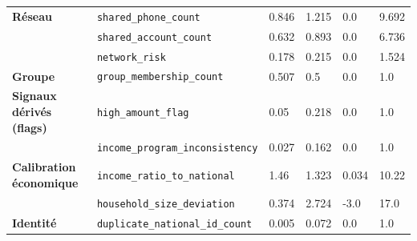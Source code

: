 \begin{table}[H]
\begin{tabular}{>{\bfseries}p{3.2cm} p{3.3cm} p{2cm} p{2cm} p{2cm} p{2cm}}
Réseau & \texttt{shared\_phone\_count} & 0.846 & 1.215 & 0.0 & 9.692 \\
\rowcolor{EYgray}
 & \texttt{shared\_account\_count} & 0.632 & 0.893 & 0.0 & 6.736 \\
 & \texttt{network\_risk} & 0.178 & 0.215 & 0.0 & 1.524 \\
\rowcolor{EYgray}
Groupe & \texttt{group\_membership\_count} & 0.507 & 0.5 & 0.0 & 1.0 \\
Signaux dérivés (flags) & \texttt{high\_amount\_flag} & 0.05 & 0.218 & 0.0 & 1.0 \\
\rowcolor{EYgray}
 & \texttt{income\_program\_inconsistency} & 0.027 & 0.162 & 0.0 & 1.0 \\
Calibration économique & \texttt{income\_ratio\_to\_national} & 1.46 & 1.323 & 0.034 & 10.22 \\
\rowcolor{EYgray}
 & \texttt{household\_size\_deviation} & 0.374 & 2.724 & -3.0 & 17.0 \\
Identité & \texttt{duplicate\_national\_id\_count} & 0.005 & 0.072 & 0.0 & 1.0 \\
\hline
\end{tabular}
\end{table}